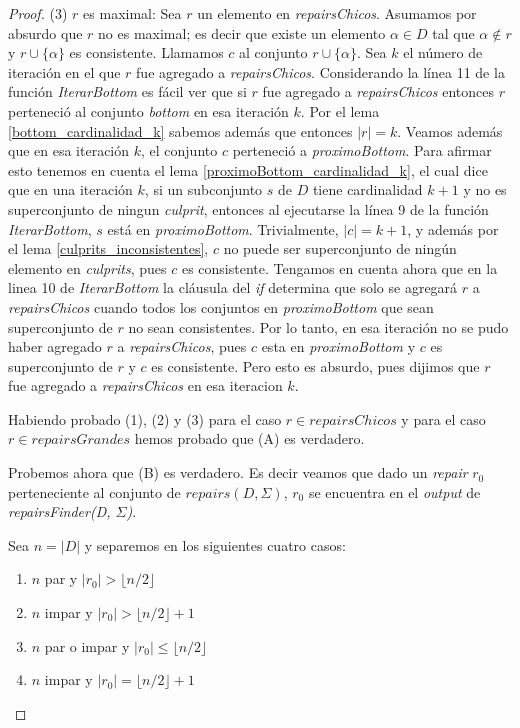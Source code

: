 \documentclass[11pt,a4paper,twoside]{tesis}
\newcommand{\parteEntera}{\lfloor n/2 \rfloor}
\begin{document}
\begin{proof}
(3) $r$ es maximal: Sea $r$ un elemento en \textit{repairsChicos}. Asumamos por absurdo que $r$ no es maximal; es decir que existe un elemento $\alpha \in D$ tal que $\alpha \not\in r$ y $r \cup \{\alpha\}$ es consistente. Llamamos $c$ al conjunto $r \cup \{\alpha\}$. Sea $k$ el número de iteración en el que $r$ fue agregado a \textit{repairsChicos}. Considerando la línea 11 de la función \textit{IterarBottom} es fácil ver que si $r$ fue agregado a \textit{repairsChicos} entonces $r$ perteneció al conjunto \textit{bottom} en esa iteración $k$. Por el lema \ref{bottom_cardinalidad_k} sabemos además que entonces $|r| = k$. Veamos además que en esa iteración $k$, el conjunto $c$ perteneció a \textit{proximoBottom}. Para afirmar esto tenemos en cuenta el lema \ref{proximoBottom_cardinalidad_k}, el cual dice que en una iteración $k$, si un subconjunto $s$ de $D$ tiene cardinalidad $k+1$ y no es superconjunto de ningun \textit{culprit}, entonces al ejecutarse la línea 9 de la función \textit{IterarBottom}, $s$ está en \textit{proximoBottom}. Trivialmente, $|c| = k+1$, y además por el lema \ref{culprits_inconsistentes}, $c$ no puede ser superconjunto de ningún elemento en \textit{culprits}, pues $c$ es consistente.
Tengamos en cuenta ahora que en la linea 10 de \textit{IterarBottom} la cláusula del \textit{if} determina que solo se agregará $r$ a \textit{repairsChicos} cuando todos los conjuntos en \textit{proximoBottom} que sean superconjunto de $r$ no sean consistentes. Por lo tanto, en esa iteración no se pudo haber agregado $r$ a \textit{repairsChicos}, pues $c$ esta en \textit{proximoBottom} y $c$ es superconjunto de $r$ y $c$ es consistente. Pero esto es absurdo, pues dijimos que $r$ fue agregado a \textit{repairsChicos} en esa iteracion $k$.

Habiendo probado (1), (2) y (3) para el caso $r \in repairsChicos$ y para el caso  $r \in repairsGrandes$ hemos probado que (A) es verdadero. 

Probemos ahora que (B) es verdadero. Es decir veamos que dado un \textit{repair} $r_0$ perteneciente al conjunto de $repairs(D, \Sigma)$, $r_0$ se encuentra en el \textit{output} de \textit{repairsFinder(D, $\Sigma$)}.

Sea $n = |D|$ y separemos en los siguientes cuatro casos:

\begin{enumerate}[(1)]
    \item $n$ par y $|r_0| > \parteEntera$
    \item $n$ impar y $|r_0| > \parteEntera + 1$
    \item $n$ par o impar y  $|r_0| \leq \parteEntera$
    \item $n$ impar y $|r_0| = \parteEntera + 1$
\end{enumerate}



\end{proof}
\end{document}
